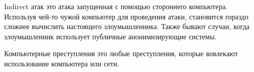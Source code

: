 
Indirect атак это атака запущенная с помощью стороннего компьютера. Используя чей-то чужой компьютер для проведения атаки, становится гораздо сложнее вычислить настоящего злоумышленника. Также бывают случаи, когда злоумышленник использует публичные анонимизирующие системы. \\


Компьютерные преступления это любые преступления, которые вовлекают использование компьютера или сети. \\


